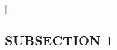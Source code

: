 \lipsum[1-3]
%
\begin{fittext}
	\begin{hitree}
		[Class
				[Item]
				[Item]
		]
	\end{hitree}
\end{fittext}
%
\subsection{SUBSECTION 1}

